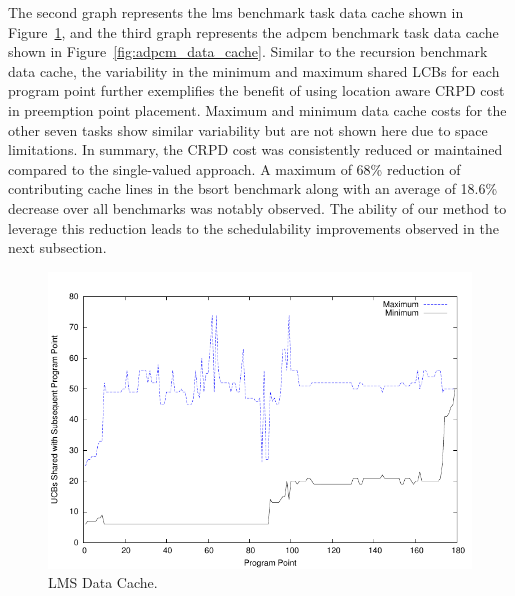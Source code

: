 The second graph represents the lms benchmark task data cache shown in Figure~\ref{fig:lms_data_cache}, and the third graph represents the adpcm benchmark task data cache shown in Figure~\ref{fig:adpcm_data_cache}. Similar to the recursion benchmark data cache, the variability in the minimum and maximum shared LCBs for each program point further exemplifies the benefit of using location aware CRPD cost in preemption point placement.  Maximum and minimum data cache costs for the other seven tasks show similar variability but are not shown here due to space limitations.  In summary, the CRPD cost was consistently reduced or maintained compared to the single-valued approach.  A maximum of 68\% reduction of contributing cache lines in the bsort benchmark along with an average of 18.6\% decrease over all benchmarks was notably observed.  The ability of our method to leverage this reduction leads to the schedulability improvements observed in the next subsection.
\begin{figure}[h!]
\vspace{-10pt}
\begin{center}
\includegraphics[width=\linewidth]{eps/lms-dcache.pdf}
\caption{LMS Data Cache.}
\label{fig:lms_data_cache}
\end{center}
\vspace{-10pt}
\end{figure}

